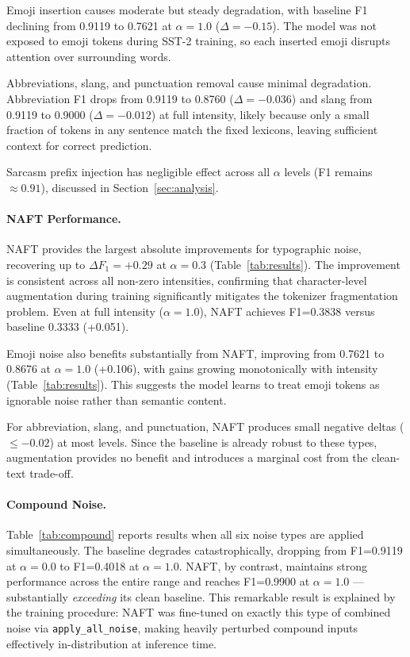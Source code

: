 \documentclass[sigconf]{acmart}
\begin{document}
Emoji insertion causes moderate but steady degradation, with
baseline F1 declining from 0.9119 to 0.7621 at $\alpha=1.0$
($\Delta = -0.15$).
The model was not exposed to emoji tokens during SST-2 training,
so each inserted emoji disrupts attention over surrounding words.

Abbreviations, slang, and punctuation removal cause minimal
degradation.
Abbreviation F1 drops from 0.9119 to 0.8760 ($\Delta=-0.036$)
and slang from 0.9119 to 0.9000 ($\Delta=-0.012$) at full
intensity, likely because only a small fraction of tokens in any
sentence match the fixed lexicons, leaving sufficient context for
correct prediction.

Sarcasm prefix injection has negligible effect across all $\alpha$
levels (F1 remains $\approx0.91$), discussed in
Section~\ref{sec:analysis}.

\paragraph{NAFT Performance.}
NAFT provides the largest absolute improvements for typographic
noise, recovering up to $\Delta F_1 = +0.29$ at $\alpha=0.3$
(Table~\ref{tab:results}).
The improvement is consistent across all non-zero intensities,
confirming that character-level augmentation during training
significantly mitigates the tokenizer fragmentation problem.
Even at full intensity ($\alpha=1.0$), NAFT achieves F1=0.3838
versus baseline 0.3333 (+0.051).

Emoji noise also benefits substantially from NAFT, improving from
0.7621 to 0.8676 at $\alpha=1.0$ (+0.106), with gains growing
monotonically with intensity (Table~\ref{tab:results}).
This suggests the model learns to treat emoji tokens as ignorable
noise rather than semantic content.

For abbreviation, slang, and punctuation, NAFT produces small
negative deltas ($\leq -0.02$) at most levels.
Since the baseline is already robust to these types, augmentation
provides no benefit and introduces a marginal cost from the
clean-text trade-off.

\paragraph{Compound Noise.}
Table~\ref{tab:compound} reports results when all six noise types
are applied simultaneously.
The baseline degrades catastrophically, dropping from F1=0.9119 at
$\alpha=0.0$ to F1=0.4018 at $\alpha=1.0$.
NAFT, by contrast, maintains strong performance across the entire
range and reaches F1=0.9900 at $\alpha=1.0$ — substantially
\emph{exceeding} its clean baseline.
This remarkable result is explained by the training procedure:
NAFT was fine-tuned on exactly this type of combined noise via
\texttt{apply\_all\_noise}, making heavily perturbed compound
inputs effectively in-distribution at inference time.
\end{document}
